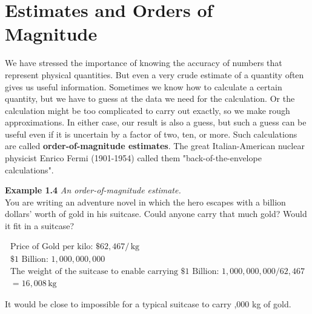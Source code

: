 \section{Estimates and Orders of Magnitude}
We have stressed the importance of knowing the accuracy of numbers that represent physical quantities. But even a very crude estimate of a quantity often gives us useful information. Sometimes we know how to calculate a certain quantity, but we have to guess at the data we need for the calculation. Or the calculation might be too complicated to carry out exactly, so we make rough approximations. In either case, our result is also a guess, but such a guess can be useful even if it is uncertain by a factor of two, ten, or more. Such calculations are called \textbf{order-of-magnitude estimates}. The great Italian-American nuclear physicist Enrico Fermi (1901-1954) called them "back-of-the-envelope calculations".

\begin{examplebox}
 \textbf{Example 1.4} \textit{An order-of-magnitude estimate.}\\

You are writing an adventure novel in which the hero escapes with a billion dollars’ worth of gold in his suitcase. Could anyone carry that much gold? Would it fit in a suitcase?
\bigskip
\begin{mathbox}
\begin{align*}
\text{Price of Gold per kilo: } \$62,467 / \,\text{kg}\\
\text{\$1 Billion: } 1,000,000,000 \\
\text{The weight of the suitcase to enable carrying \$1 Billion: } 1,000,000,000 / 62,467 \\ 
=16,008 \,\text{kg}
\end{align*}
\end{mathbox}
It would be close to impossible for a typical suitcase to carry ,000 kg of gold.
\end{examplebox}

